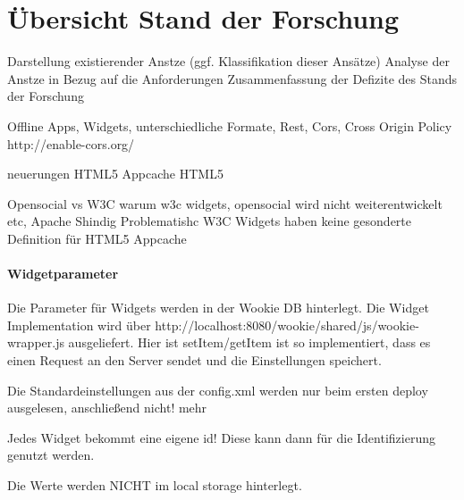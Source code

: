 \chapter{Übersicht Stand der Forschung} 
\label{Kapitel 4}
Darstellung existierender Anstze (ggf. Klassifikation dieser Ansätze)
Analyse der Anstze in Bezug auf die Anforderungen
Zusammenfassung der Defizite des Stands der Forschung

Offline Apps,
Widgets,
unterschiedliche Formate,
Rest,
Cors,
Cross Origin Policy
http://enable-cors.org/

neuerungen HTML5
Appcache HTML5

Opensocial vs W3C
warum w3c widgets, opensocial wird nicht weiterentwickelt etc, Apache Shindig Problematishc
W3C Widgets haben keine gesonderte Definition für HTML5 Appcache




\subsubsection{Widgetparameter}
Die Parameter für Widgets werden in der Wookie DB hinterlegt.
Die Widget Implementation wird über http://localhost:8080/wookie/shared/js/wookie-wrapper.js ausgeliefert.
Hier ist setItem/getItem ist so implementiert, dass es einen Request an den Server sendet und die Einstellungen speichert.

Die Standardeinstellungen aus der config.xml werden nur beim ersten deploy ausgelesen, anschließend nicht! mehr

Jedes Widget bekommt eine eigene id! Diese kann dann für die Identifizierung genutzt werden.

Die Werte werden NICHT im local storage hinterlegt.